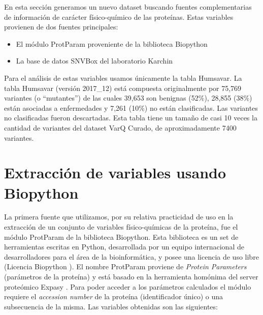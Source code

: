 
En esta sección generamos un nuevo dataset buscando fuentes complementarias de información de carácter físico-químico de las proteínas. Estas variables provienen de dos fuentes principales:

\begin{itemize}
    \item El módulo ProtParam proveniente de la biblioteca Biopython \cite{Chapman:2000:BPT:360262.360268}
    \item La base de datos SNVBox del laboratorio Karchin \cite{Wong2011}
\end{itemize}

Para el análisis de estas variables usamos únicamente la tabla Humsavar. La tabla Humsavar (versión 2017\_12) \cite{humsavar} está compuesta originalmente por 75,769 variantes (o ``mutantes'') de las cuales 39,653 son benignas (52\%), 28,855 (38\%) están asociadas a enfermedades y 7,261 (10\%) no están clasificadas. Las variantes no clasificadas fueron descartadas. Esta tabla tiene un tamaño de casi 10 veces la cantidad de variantes del dataset VarQ Curado, de aproximadamente 7400 variantes.

\section{Extracción de variables usando Biopython}

La primera fuente que utilizamos, por su relativa practicidad de uso en la extracción de un conjunto de variables físico-químicas de la proteína, fue el módulo ProtParam de la biblioteca Biopython. Esta biblioteca es un set de herramientas escritas en Python, desarrollada por un equipo internacional de desarrolladores para el área de la bioinformática, y posee una licencia de uso libre (Licencia Biopython \cite{biopython-license}).
El nombre ProtParam proviene de \textit{Protein Parameters} (parámetros de la proteína) y está basado en la herramienta homónima del server proteómico Expasy \cite{expasy}. Para poder acceder a los parámetros calculados el módulo requiere el \textit{accession number} de la proteína (identificador único) o una subsecuencia de la misma. Las variables obtenidas son las siguientes:

